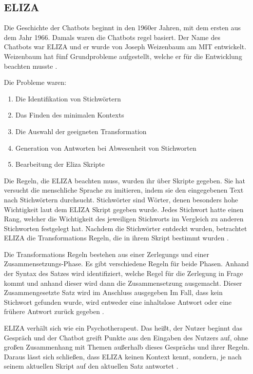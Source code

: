 \subsection{ELIZA}
Die Geschichte der Chatbots beginnt in den 1960er Jahren, mit dem ersten aus dem Jahr 1966. Damals waren die Chatbots regel basiert. 
Der Name des Chatbots war ELIZA und er wurde von Joseph Weizenbaum am MIT entwickelt.
Weizenbaum hat fünf Grundprobleme aufgestellt, welche er für die Entwicklung beachten musste \cite{weizenbaumELIZAComputerProgram1966}. \par
Die Probleme waren:
\begin{enumerate}
    \item Die Identifikation von Stichwörtern
    \item Das Finden des minimalen Kontexts
    \item Die Auswahl der geeigneten Transformation
    \item Generation von Antworten bei Abwesenheit von Stichworten
    \item Bearbeitung der Eliza Skripte
\end{enumerate}
Die Regeln, die ELIZA beachten muss, wurden ihr über Skripte gegeben.
Sie hat versucht die menschliche Sprache zu imitieren, indem sie den 
eingegebenen Text nach Stichwörtern durchsucht.
Stichwörter sind 
Wörter, denen besonders hohe Wichtigkeit laut dem ELIZA Skript gegeben wurde. 
Jedes Stichwort hatte einen Rang, welcher die Wichtigkeit des 
jeweiligen Stichworts im Vergleich zu anderen Stichworten festgelegt
hat. Nachdem die Stichwörter entdeckt wurden, betrachtet ELIZA die Transformations Regeln, die 
in ihrem Skript bestimmt wurden \cite{weizenbaumELIZAComputerProgram1966}. \par
Die Transformations Regeln bestehen aus einer Zerlegungs und einer
Zusammensetzungs-Phase. Es gibt verschiedene Regeln für beide Phasen. Anhand der Syntax des Satzes wird identifiziert, 
welche Regel für die Zerlegung in Frage kommt und anhand dieser
wird dann die Zusammensetzung ausgemacht. 
Dieser Zusammengesetzte Satz wird im Anschluss ausgegeben
Im Fall, dass kein Stichwort gefunden wurde, wird entweder 
eine inhaltslose Antwort oder eine frühere Antwort zurück gegeben \cite{weizenbaumELIZAComputerProgram1966}. \par
ELIZA 
verhält sich wie ein Psychotherapeut. Das heißt, der Nutzer beginnt das Gespräch und der Chatbot greift 
Punkte aus den Eingaben des Nutzers auf, ohne großen
Zusammenhang mit Themen außerhalb dieses Gesprächs und ihrer Regeln. Daraus lässt sich schließen, dass ELIZA keinen Kontext kennt, sondern, 
je nach seinem aktuellen Skript auf den aktuellen Satz antwortet \cite{weizenbaumELIZAComputerProgram1966}.

